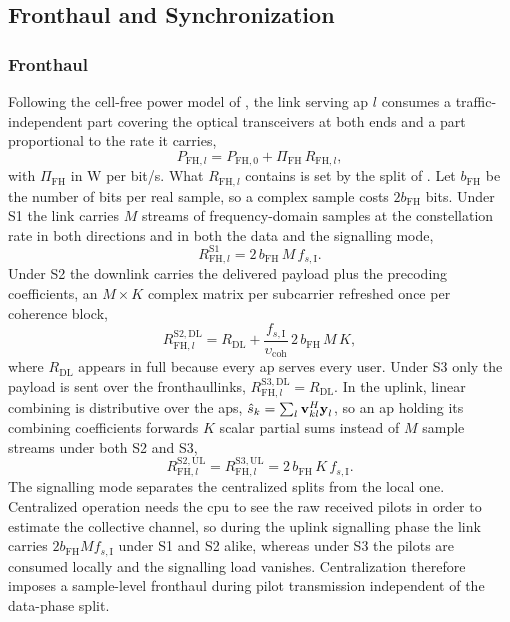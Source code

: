 \subsection{Fronthaul and Synchronization}
\label{ssec:fh}

\subsubsection{Fronthaul}
Following the cell-free power model of \cite{ngo2018total}, the link serving
\gls{ap} $l$ consumes a traffic-independent part covering the optical
transceivers at both ends and a part proportional to the rate it carries,
\begin{equation}
\label{eq:fh_basic}
P_{\mathrm{FH},l} = P_{\mathrm{FH},0} + \Pi_{\mathrm{FH}}\,R_{\mathrm{FH},l},
\end{equation}
with $\Pi_{\mathrm{FH}}$ in W per bit/s. What $R_{\mathrm{FH},l}$ contains is set
by the split of . Let $b_{\mathrm{FH}}$ be the number of bits
per real sample, so a complex sample costs $2b_{\mathrm{FH}}$ bits. Under S1 the
link carries $M$ streams of frequency-domain samples at the constellation rate
in both directions and in both the data and the signalling mode,
\begin{equation}
\label{eq:fh_s1}
R_{\mathrm{FH},l}^{\mathrm{S1}} = 2\,b_{\mathrm{FH}}\,M\,f_{s,\mathrm{I}} .
\end{equation}
Under S2 the downlink carries the delivered payload plus the precoding
coefficients, an $M\times K$ complex matrix per subcarrier refreshed once per
coherence block,
\begin{equation}
\label{eq:fh_s2}
R_{\mathrm{FH},l}^{\mathrm{S2,DL}} = R_{\mathrm{DL}}
+ \frac{f_{s,\mathrm{I}}}{\upsilon_{\mathrm{coh}}}\,2\,b_{\mathrm{FH}}\,M\,K,
\end{equation}
where $R_{\mathrm{DL}}$ appears in full because every \gls{ap} serves every
user. Under S3 only the payload is sent over the fronthaullinks, $R_{\mathrm{FH},l}^{\mathrm{S3,DL}} =
R_{\mathrm{DL}}$. In the uplink, linear combining is distributive over the
\glspl{ap}, $\hat s_{k}=\sum_{l}\boldsymbol{\mathrm{v}}_{kl}^{H}\boldsymbol{\mathrm{y}}_{l}$, so an \gls{ap}
holding its combining coefficients forwards $K$ scalar partial sums instead of
$M$ sample streams under both S2 and S3,
\begin{equation}
\label{eq:fh_ul}
R_{\mathrm{FH},l}^{\mathrm{S2,UL}} = R_{\mathrm{FH},l}^{\mathrm{S3,UL}}
= 2\,b_{\mathrm{FH}}\,K\,f_{s,\mathrm{I}} .
\end{equation}
The signalling mode separates the centralized splits from the local one.
Centralized operation needs the \gls{cpu} to see the raw received pilots in order
to estimate the collective channel, so during the uplink signalling phase the
link carries $2b_{\mathrm{FH}}Mf_{s,\mathrm{I}}$ under S1 and S2 alike, whereas
under S3 the pilots are consumed locally and the signalling load vanishes.
Centralization therefore imposes a sample-level fronthaul during pilot
transmission independent of the data-phase split.

